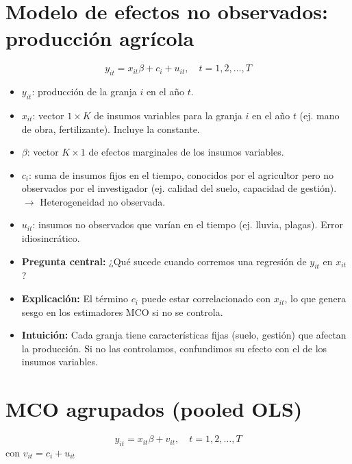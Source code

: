 \documentclass[12pt]{article}
\begin{document}
\section*{\noindent\textbf{Modelo de efectos no observados: producción agrícola}}

\[
y_{it} = x_{it}\beta + c_i + u_{it}, 
\quad t = 1,2,\dots,T
\]

\begin{itemize}
    \item $y_{it}$: producción de la granja $i$ en el año $t$.
    \item $x_{it}$: vector $1 \times K$ de insumos variables para la granja $i$ en el año $t$ 
    (ej. mano de obra, fertilizante). Incluye la constante.
    \item $\beta$: vector $K \times 1$ de efectos marginales de los insumos variables.
    \item $c_i$: suma de insumos fijos en el tiempo, conocidos por el agricultor 
    pero no observados por el investigador 
    (ej. calidad del suelo, capacidad de gestión). $\rightarrow$ Heterogeneidad no observada.
    \item $u_{it}$: insumos no observados que varían en el tiempo 
    (ej. lluvia, plagas). Error idiosincrático.
    \item \textbf{Pregunta central:} ¿Qué sucede cuando corremos una regresión de $y_{it}$ en $x_{it}$?
\end{itemize}

\begin{itemize}
    \item \textbf{Explicación:} El término $c_i$ puede estar correlacionado con $x_{it}$, 
    lo que genera sesgo en los estimadores MCO si no se controla.
    \item \textbf{Intuición:} Cada granja tiene características fijas (suelo, gestión) que afectan la producción. 
    Si no las controlamos, confundimos su efecto con el de los insumos variables.
\end{itemize}

\section*{\noindent\textbf{MCO agrupados (pooled OLS)}}

\[
y_{it} = x_{it}\beta + v_{it}, \quad t = 1,2,\dots,T
\]
con \quad $v_{it} = c_i + u_{it}$
\end{document}
